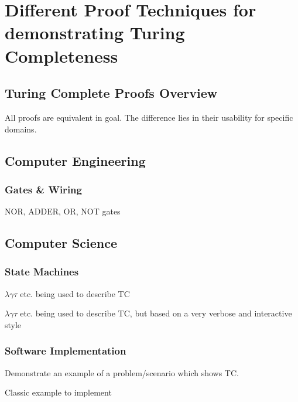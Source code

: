 \section{Different Proof Techniques for demonstrating Turing Completeness}

\subsection{Turing Complete Proofs Overview}

All proofs are equivalent in goal.
The difference lies in their usability for specific domains.



\subsection{Computer Engineering}

\subsubsection{Gates \& Wiring}

NOR, ADDER, OR, NOT gates


\subsection{Computer Science}

\subsubsection{State Machines}


$\lambda \gamma \tau $ etc. being used to describe TC


$\lambda \gamma \tau $ etc. being used to describe TC, but based on a very verbose and interactive style

\subsubsection{Software Implementation}

Demonstrate an example of a problem/scenario which shows TC.


Classic example to implement



